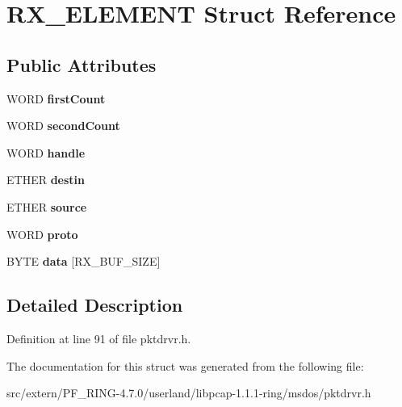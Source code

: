 \hypertarget{struct_r_x___e_l_e_m_e_n_t}{
\section{RX\_\-ELEMENT Struct Reference}
\label{struct_r_x___e_l_e_m_e_n_t}
}
\subsection*{Public Attributes}
\begin{DoxyCompactItemize}
\item 
\hypertarget{struct_r_x___e_l_e_m_e_n_t_a84c659f3100ab4010946ac22704c0288}{
WORD {\bfseries firstCount}}
\label{struct_r_x___e_l_e_m_e_n_t_a84c659f3100ab4010946ac22704c0288}

\item 
\hypertarget{struct_r_x___e_l_e_m_e_n_t_aa154d2a8b01528b0a55d1f2693a2f3e2}{
WORD {\bfseries secondCount}}
\label{struct_r_x___e_l_e_m_e_n_t_aa154d2a8b01528b0a55d1f2693a2f3e2}

\item 
\hypertarget{struct_r_x___e_l_e_m_e_n_t_afe8994b0ee30a7b270212c257964df28}{
WORD {\bfseries handle}}
\label{struct_r_x___e_l_e_m_e_n_t_afe8994b0ee30a7b270212c257964df28}

\item 
\hypertarget{struct_r_x___e_l_e_m_e_n_t_aeb0b32a3e4382f68809f3015cafb66d2}{
ETHER {\bfseries destin}}
\label{struct_r_x___e_l_e_m_e_n_t_aeb0b32a3e4382f68809f3015cafb66d2}

\item 
\hypertarget{struct_r_x___e_l_e_m_e_n_t_a22631fa494a982f0c39b312577066ea8}{
ETHER {\bfseries source}}
\label{struct_r_x___e_l_e_m_e_n_t_a22631fa494a982f0c39b312577066ea8}

\item 
\hypertarget{struct_r_x___e_l_e_m_e_n_t_a805e583924aebaa6c1456f16db395099}{
WORD {\bfseries proto}}
\label{struct_r_x___e_l_e_m_e_n_t_a805e583924aebaa6c1456f16db395099}

\item 
\hypertarget{struct_r_x___e_l_e_m_e_n_t_a6870dd8fb0a9f2d7d55faceccbe26ebd}{
BYTE {\bfseries data} \mbox{[}RX\_\-BUF\_\-SIZE\mbox{]}}
\label{struct_r_x___e_l_e_m_e_n_t_a6870dd8fb0a9f2d7d55faceccbe26ebd}

\end{DoxyCompactItemize}


\subsection{Detailed Description}


Definition at line 91 of file pktdrvr.h.



The documentation for this struct was generated from the following file:\begin{DoxyCompactItemize}
\item 
src/extern/PF\_\-RING-\/4.7.0/userland/libpcap-\/1.1.1-\/ring/msdos/pktdrvr.h\end{DoxyCompactItemize}
